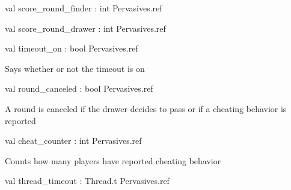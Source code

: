 \documentclass[11pt]{article}
\begin{document}
\label{val:Server.score-underscoreround-underscorefinder}\begin{ocamldoccode}
val score_round_finder : int Pervasives.ref
\end{ocamldoccode}




\label{val:Server.score-underscoreround-underscoredrawer}\begin{ocamldoccode}
val score_round_drawer : int Pervasives.ref
\end{ocamldoccode}




\label{val:Server.timeout-underscoreon}\begin{ocamldoccode}
val timeout_on : bool Pervasives.ref
\end{ocamldoccode}
\begin{ocamldocdescription}
Says whether or not the timeout is on


\end{ocamldocdescription}




\label{val:Server.round-underscorecanceled}\begin{ocamldoccode}
val round_canceled : bool Pervasives.ref
\end{ocamldoccode}
\begin{ocamldocdescription}
A round is canceled if the drawer decides to pass or if a cheating behavior is reported


\end{ocamldocdescription}




\label{val:Server.cheat-underscorecounter}\begin{ocamldoccode}
val cheat_counter : int Pervasives.ref
\end{ocamldoccode}
\begin{ocamldocdescription}
Counts how many players have reported cheating behavior


\end{ocamldocdescription}




\label{val:Server.thread-underscoretimeout}\begin{ocamldoccode}
val thread_timeout : Thread.t Pervasives.ref
\end{ocamldoccode}
\end{document}
